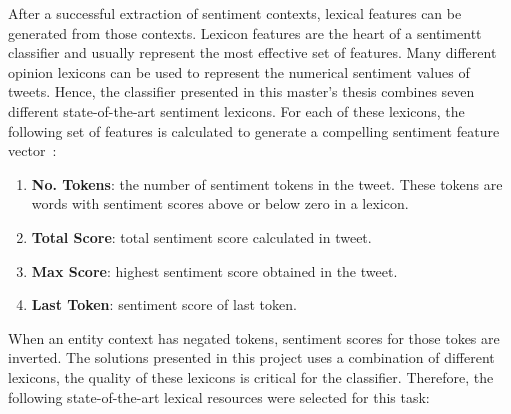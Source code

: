 After a successful extraction of sentiment contexts, lexical features can be generated from those contexts. Lexicon features are the heart of a sentimentt classifier and usually represent the most effective set of features.  Many different opinion lexicons can be used to represent the numerical sentiment values of tweets. Hence, the classifier presented in this master's thesis combines seven different state-of-the-art sentiment lexicons.  For each of these lexicons, the following set of features is calculated to generate a compelling sentiment feature vector~\cite{MohammadKZ2013}:

\begin{enumerate}
\itemsep0em 

\item \textbf{No. Tokens}: the number of sentiment tokens in the tweet.  These tokens are words with sentiment scores above or below zero in a lexicon.

\item  \textbf{Total Score}: total sentiment score calculated in tweet. 

\item \textbf{Max Score}: highest sentiment score obtained in the tweet.

\item \textbf{Last Token}: sentiment score of last token.

\end{enumerate}

When an entity context has negated tokens, sentiment scores for those tokes are inverted. The solutions presented in this project uses a combination of different lexicons, the quality of these lexicons is critical for the classifier. Therefore, the following state-of-the-art lexical resources were selected for this task:  

\pagebreak

